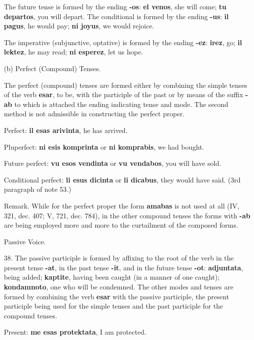The future tense is formed by the ending \textbf{-os}: \textbf{el venos}, she will come; \textbf{tu departos}, you will depart. 
The conditional is formed by the ending \textbf{-us}: \textbf{il pagus}, he would pay; \textbf{ni joyus}, we would rejoice. 

The imperative (subjunctive, optative) is formed by the ending \textbf{-ez}: \textbf{irez}, go; \textbf{il lektez}, he may read; \textbf{ni esperez}, let us hope. 

\Centering (b) Perfect (Compound) Tenses. \\ \justifying

The perfect (compound) tenses are formed either by combining the simple tenses of the verb \textbf{esar}, to be, with the participle of the past or by means of the suffix \textbf{-ab} to which is attached the ending indicating tense and mode. The second method is not admissible in constructing the perfect proper. 

Perfect: \textbf{il esas arivinta}, he has arrived. 

Pluperfect: \textbf{ni esis komprinta} or \textbf{ni komprabis}, we had bought. 

Future perfect: \textbf{vu esos vendinta} or \textbf{vu vendabos}, you will have sold. 

Conditional perfect: \textbf{li esus dicinta} or \textbf{li dicabus}, they would have said. (3rd paragraph of note 53.) 

\small Remark. While for the perfect proper the form \textbf{amabas} is not used at all (IV, 321, dec. 407; V, 721, dec. 784), in the other compound tenses the forms with \textbf{-ab} are being employed more and more to the curtailment of the composed forms. \normalsize

\Centering Passive Voice. \\ \justifying

38. The passive participle is formed by affixing to the root of the verb in the present tense \textbf{-at}, in the past tense \textbf{-it}, and in the future tense \textbf{-ot}: \textbf{adjuntata}, being added; \textbf{kaptite}, having been caught (in a manner of one caught); \textbf{kondamnoto}, one who will be condemned. 
The other modes and tenses are formed by combining the verb \textbf{esar} with the passive participle, the present participle being used for the simple tenses and the past participle for the compound tenses. 

Present: \textbf{me esas protektata}, I am protected. 

